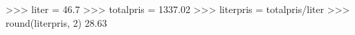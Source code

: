 >>> liter = 46.7
>>> totalpris = 1337.02
>>> literpris = totalpris/liter
>>> round(literpris, 2)
28.63